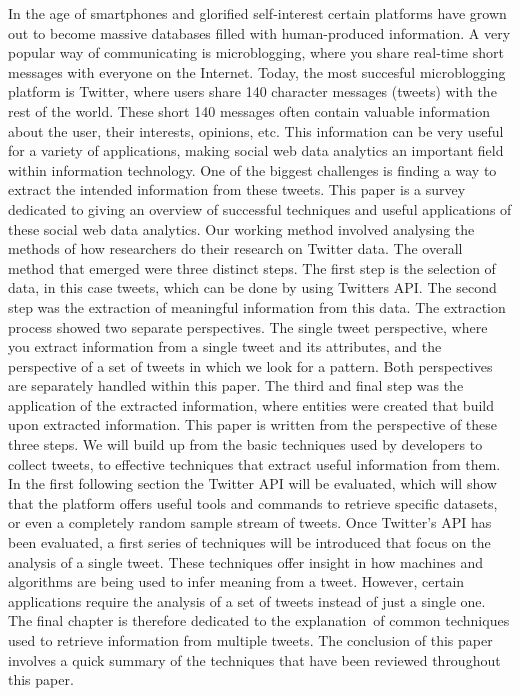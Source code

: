 \documentclass{article}
\begin{document}
In the age of smartphones and glorified self-interest certain platforms have grown out to become massive databases filled with human-produced information.
A very popular way of communicating is microblogging, where you share real-time short messages with everyone on the Internet. Today, the most succesful
microblogging platform is Twitter, where users share 140 character messages (tweets) with the rest of the world. These short 140 messages often contain 
valuable information about the user, their interests, opinions, etc. This information can be very useful for a variety of applications, 
making social web data analytics an important field within information technology. One of the biggest challenges is finding a way to extract the intended 
information from these tweets. This paper is a survey dedicated to giving an overview of successful techniques and useful applications of these social 
web data analytics. Our working method involved analysing the methods of how researchers do their research on Twitter data. The overall method that emerged 
were three distinct steps. The first step is the selection of data, in this case tweets, which can be done by using Twitters API. The second step was the 
extraction of meaningful information from this data. The extraction process showed two separate perspectives. The single tweet perspective, where you extract
information from a single tweet and its attributes, and the perspective of a set of tweets in which we look for a pattern. Both perspectives are separately
handled within this paper. The third and final step was the application of the extracted information, where entities were created that build upon extracted 
information.
This paper is written from the perspective of these three steps. We will build up from the basic techniques used by developers to collect tweets, to effective techniques that extract useful information from them. 
In the first following section the Twitter API will be evaluated, which will show that the platform offers useful tools and commands to retrieve 
specific datasets, or even a completely random sample stream of tweets. Once Twitter's API has been evaluated, a first series of techniques will be introduced
that focus on the analysis of a single tweet. These techniques offer insight in how machines and algorithms are being used to infer meaning from a tweet.
However, certain applications require the analysis of a set of tweets instead of just a single one. The final chapter is therefore dedicated to the explanation\
of common techniques used to retrieve information from multiple tweets. The conclusion of this paper involves a quick summary of the techniques that
have been reviewed throughout this paper.
\end{document}
